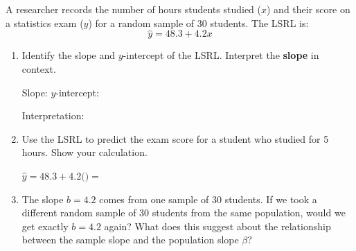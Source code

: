 \documentclass[10pt]{article}
\begin{document}
\namedateperiod

\vspace{0.15in}

A researcher records the number of hours students studied ($x$) and their score
on a statistics exam ($y$) for a random sample of 30 students. The LSRL is:
\[
    \hat{y} = 48.3 + 4.2x
\]

\begin{enumerate}

  \item Identify the slope and $y$-intercept of the LSRL. Interpret the
        \textbf{slope} in context.

        Slope:  \quad $y$-intercept: 

        \vspace{0.05in}
        Interpretation: 

        \vspace{0.1in}

  \item Use the LSRL to predict the exam score for a student who studied
        for 5 hours. Show your calculation.

        \vspace{0.05in}
        $\hat{y} = 48.3 + 4.2($$) = $ 

        \vspace{0.1in}

  \item The slope $b = 4.2$ comes from one sample of 30 students. If we took a
        different random sample of 30 students from the same population, would
        we get exactly $b = 4.2$ again? What does this suggest about the
        relationship between the sample slope and the population slope $\beta$?


\end{enumerate}
\end{document}
